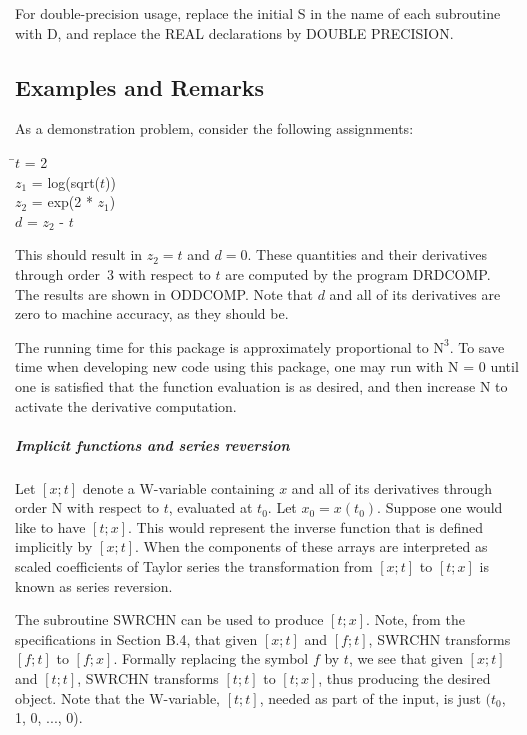\documentclass[twoside]{MATH77}
\begin{document}
For double-precision usage, replace the initial S in the name of each
subroutine with D, and replace the REAL declarations by DOUBLE PRECISION.

\subsection{Examples and Remarks}

As a demonstration problem, consider the following assignments:

\begin{tabbing}
\hspace{.2in}\=$t$ = 2\\
\>$z_1$ = log(sqrt($t$))\\
\>$z_2$ = exp(2 * $z_1$)\\
\>$d$ = $z_2$ - $t$
\end{tabbing}

This should result in $z_2 = t$ and $d = 0$. These quantities and their
derivatives through order~3 with respect to $t$ are computed by the program
DRDCOMP. The results are shown in ODDCOMP. Note that $d$ and all of its
derivatives are zero to machine accuracy, as they should be.

The running time for this package is approximately proportional to $\text{N}%
^3$. To save time when developing new code using this package, one may run
with N = 0 until one is satisfied that the function evaluation is as
desired, and then increase N to activate the derivative computation.

\subparagraph{Implicit functions and series reversion}

Let $[x;t]$ denote a W-variable containing $x$ and all of its derivatives
through order N with respect to $t$, evaluated at $t_0$. Let $x_0 = x(t_0)$.
Suppose one would like to have $[t;x]$. This would represent the inverse
function that is defined implicitly by $[x;t]$. When the components of these
arrays are interpreted as scaled coefficients of Taylor series the
transformation from $[x;t]$ to $[t;x]$ is known as series reversion.

The subroutine SWRCHN can be used to produce $[t;x]$. Note, from the
specifications in Section B.4, that given $[x;t]$ and $[f;t]$, SWRCHN
transforms $[f;t]$ to $[f;x]$. Formally replacing the symbol $f$ by $t$, we
see that given $[x;t]$ and $[t;t]$, SWRCHN transforms $[t;t]$ to $[t;x]$,
thus producing the desired object. Note that the W-variable, $[t;t]$, needed
as part of the input, is just $(t_0$, 1, 0, ..., 0).
\end{document}
